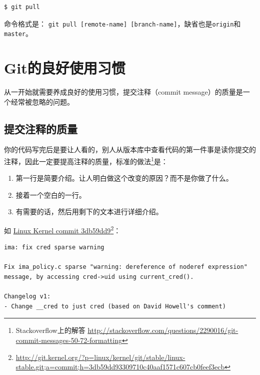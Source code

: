 \begin{verbatim}
$ git pull
\end{verbatim}

命令格式是： \texttt{git pull [remote-name] [branch-name]}，缺省也是\texttt{origin}和\texttt{master}。

\section{Git的良好使用习惯}
\label{git的良好使用习惯}

从一开始就需要养成良好的使用习惯，提交注释（commit message）的质量是一个经常被忽略的问题。

\subsection{提交注释的质量}
\label{提交注释的质量}

你的代码写完后是要让人看的，别人从版本库中查看代码的第一件事是读你提交的注释，因此一定要提高注释的质量，标准的做法\footnote{Stackoverflow上的解答 \href{http://stackoverflow.com/questions/2290016/git-commit-messages-50-72-formatting}{http:/\slash stackoverflow.com\slash questions\slash 2290016\slash git-commit-messages-50-72-formatting}}是：

\begin{enumerate}
\item 第一行是简要介绍。让人明白做这个改变的原因？而不是你做了什么。

\item 接着一个空白的一行。

\item 有需要的话，然后用剩下的文本进行详细介绍。

\end{enumerate}

如 \href{http://git.kernel.org/?p=linux/kernel/git/stable/linux-stable.git;a=commit;h=3db59dd93309710c40aaf1571c607cb0feef3ecb}{Linux Kernel commit 3db59dd9}\footnote{\href{http://git.kernel.org/?p=linux/kernel/git/stable/linux-stable.git;a=commit;h=3db59dd93309710c40aaf1571c607cb0feef3ecb}{http:/\slash git.kernel.org\slash ?p=linux\slash kernel\slash git\slash stable\slash linux-stable.git;a=commit;h=3db59dd93309710c40aaf1571c607cb0feef3ecb}}：

\begin{verbatim}
ima: fix cred sparse warning

Fix ima_policy.c sparse "warning: dereference of noderef expression"
message, by accessing cred->uid using current_cred().

Changelog v1:
- Change __cred to just cred (based on David Howell's comment)
\end{verbatim}

